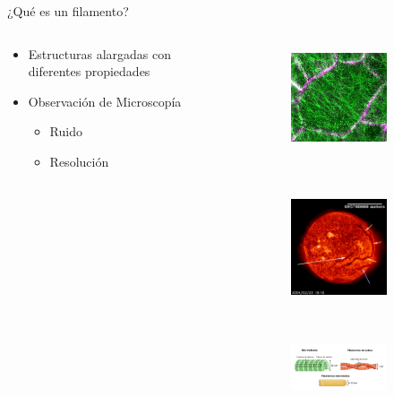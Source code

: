 \documentclass[]{beamer}
\newenvironment{figure*}%
{\begin{figure}}
{\end{figure}}
\begin{document}
\begin{frame}{¿Qu\'e es un filamento?}
    \begin{columns}
    \begin{column}{0.32\textwidth}
        \begin{itemize}
            \item Estructuras alargadas con diferentes propiedades
            \item Observaci\'on de Microscop\'ia
            \begin{itemize}
            \small
                \item Ruido
                \item Resoluci\'on
            \end{itemize}
        \end{itemize}
    \end{column}
    \begin{column}{0.68\textwidth}
        \begin{figure}[h]
          \centering
            \begin{subfigure}[t]{0.48\textwidth}
            \includegraphics[height=1.2in]{Pictures/small_MT.jpg}
            \end{subfigure}
            ~ 
            \begin{subfigure}[t]{0.48\textwidth}
            \includegraphics[height=1.2in]{Pictures/sun_filament.jpg}
            \end{subfigure}
            \vspace{0.5cm}
             \begin{subfigure}[t]{\textwidth}
             \includegraphics[height=1.2in]{Pictures/citoesqueletoo-min.png}
            \end{subfigure}
    
        \end{figure}
    \end{column}
\end{columns}
\end{frame}
\end{document}
